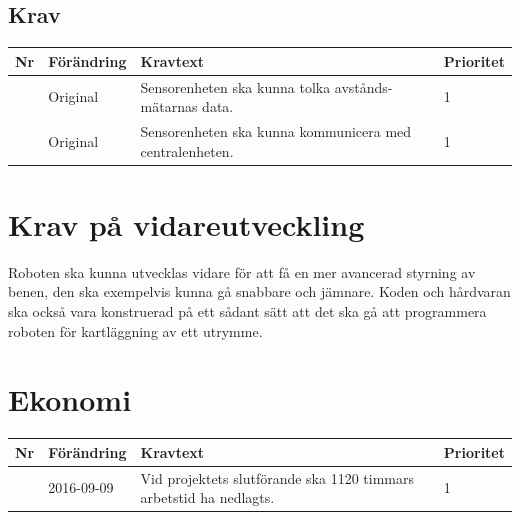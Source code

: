 \documentclass[a4paper,titlepage,12pt]{article}
\newcounter{reqNr}
\newcommand{\nextReqNr}{\stepcounter{reqNr}\arabic{reqNr}}
\begin{document}
	\subsection{Krav}
	\begin{table}[h]
		\label{tab:Krav sensorenhet}
		\begin{tabularx}{\textwidth}{|c|l|X|l|}
			\hline
			\textbf{Nr} & \textbf{Förändring} & \textbf{Kravtext} & \textbf{Prioritet} 
				\\ \hline

			\nextReqNr & Original & Sensorenheten ska kunna tolka avstånds- mätarnas data. & 1
				\\ \hline

			\nextReqNr & Original & Sensorenheten ska kunna kommunicera med 
				centralenheten. & 1
				\\ \hline

		\end{tabularx}
	\end{table}


	\section{Krav på vidareutveckling}
	Roboten ska kunna utvecklas vidare för att få en mer avancerad styrning av benen, 
	den ska exempelvis kunna gå snabbare och jämnare. Koden och hårdvaran ska också vara
	konstruerad på ett sådant sätt att det ska gå att programmera roboten för
	kartläggning av ett utrymme.

	\section{Ekonomi}

	\begin{table}[h]
		\label{tab:Krav motorikenhet}
		\begin{tabularx}{\textwidth}{|c|l|X|l|}
			\hline
			\textbf{Nr} & \textbf{Förändring} & \textbf{Kravtext} & \textbf{Prioritet} 
			\\ \hline
			
			\nextReqNr & 2016-09-09 & Vid projektets slutförande ska 1120 timmars arbetstid ha nedlagts. & 1
			\\ \hline
		\end{tabularx}
	\end{table}
\end{document}
